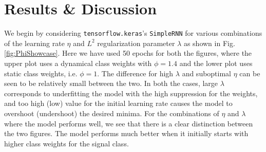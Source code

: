 \documentclass[%
reprint,
amsmath,amssymb,
aps,
]{revtex4-2}
\begin{document}
\section{Results \& Discussion}
We begin by considering \texttt{tensorflow.keras}'s \texttt{SimpleRNN} for various combinations of the learning rate $\eta$ and $L^2$ regularization parameter $\lambda$ as shown in Fig. \ref{fig:PhiShowcase}. Here we have used 50 epochs for both the figures, where the upper plot uses a dynamical class weights with $\phi=1.4$ and the lower plot uses static class weights, i.e. $\phi=1$. The difference for high $\lambda$ and suboptimal $\eta$ can be seen to be relatively small between the two. In both the cases, large $\lambda$ corresponds to underfitting the model with the high suppression for the weights, and too high (low) value for the initial learning rate causes the model to overshoot (undershoot) the desired minima. For the combinations of $\eta$ and $\lambda$ where the model performs well, we see that there is a clear distinction between the two figures. The model performs much better when it initially starts with higher class weights for the signal class.
\end{document}
